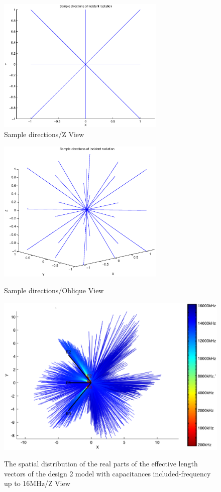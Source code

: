 \documentclass[a4paper,14pt]{extbook}
\begin{document}
\begin{figure}
\begin{center}
\includegraphics[width=8cm]{SampleDirection_ZView.eps}\\
\caption{Sample directions/Z View}\label{fig_sample_z}
\includegraphics[width=8cm]{SampleDirection_oblique.eps} \\
\caption{Sample directions/Oblique View}\label{fig_sample_oblique}
\end{center}
\end{figure}

\begin{figure}
\begin{center}
\includegraphics[scale=0.65]{HeffVerteilungD2-ZView_caps.eps} \\
\caption{The spatial distribution of the real parts of the effective length vectors of the design 2 model with capacitances included-frequency up to 16MHz/Z View }\label{fig_heff_dist_D2_A_Z_View_caps}
\end{center}
\end{figure}
\end{document}
